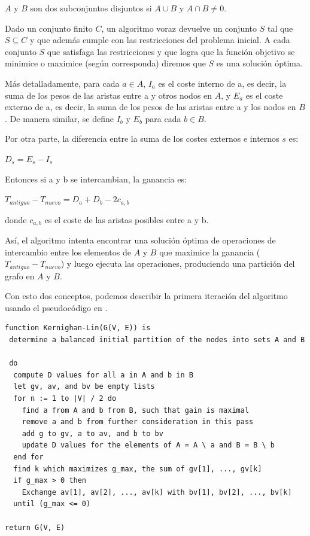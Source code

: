 \begin{mydef}\label{disjuntos}
	$A$ y $B$ son dos subconjuntos disjuntos si $A \cup B$ y $A \cap B \neq 0$.
\end{mydef}

\begin{mydef}\label{voraz}
	Dado un conjunto finito $C$, un algoritmo voraz devuelve un conjunto $S$ tal que $S\subseteq C$ y que además cumple con las restricciones del problema inicial. A cada conjunto $S$ que satisfaga las restricciones y que logra que la función objetivo se minimice o maximice (según corresponda) diremos que $S$ es una solución óptima. 
\end{mydef}

Más detalladamente, para cada $a \in A$, $I_{a}$ es el coste interno de a, es decir, la suma de los pesos de las aristas entre a y otros nodos en $A$, y $E_{a}$ es el coste externo de a, es decir, la suma de los pesos de las aristas entre a y los nodos en $B$. De manera similar, se define $I_{b}$ y $E_{b}$ para cada $b \in B$.

Por otra parte, la diferencia entre la suma de los costes externos e internos $s$ es:

\begin{center}
	$D_{s} = E_{s} - I_{s}$
\end{center}

Entonces si a y b se intercambian, la ganancia es:

\begin{center}
	$T_{antiguo} - T_{nuevo} = D_{a} + D_{b} - 2c_{a, b}$ 
\end{center}

donde $c_{a, b}$ es el coste de las aristas posibles entre a y b.

Así, el algoritmo intenta encontrar una solución óptima de operaciones de intercambio entre los elementos de $A$ y $B$ que maximice la ganancia ($T_{antiguo} - T_{nuevo}$) y luego ejecuta las operaciones, produciendo una partición del grafo en $A$ y $B$.

Con esto dos conceptos, podemos describir la primera iteración del algoritmo usando el pseudocódigo en \cite{Ravikumar}.

\begin{lstlisting}[frame=single] 
function Kernighan-Lin(G(V, E)) is
 determine a balanced initial partition of the nodes into sets A and B

 do
  compute D values for all a in A and b in B
  let gv, av, and bv be empty lists
  for n := 1 to |V| / 2 do
    find a from A and b from B, such that gain is maximal
    remove a and b from further consideration in this pass
	add g to gv, a to av, and b to bv
	update D values for the elements of A = A \ a and B = B \ b
  end for
  find k which maximizes g_max, the sum of gv[1], ..., gv[k]
  if g_max > 0 then
    Exchange av[1], av[2], ..., av[k] with bv[1], bv[2], ..., bv[k]
  until (g_max <= 0)  
    
return G(V, E) 
\end{lstlisting}

